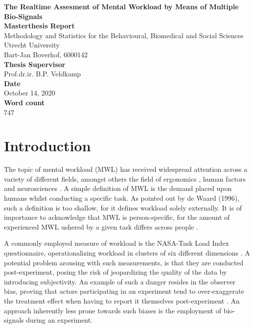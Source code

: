 \documentclass{article}
\begin{document}
\begin{titlepage}
\begin{center}
\LARGE{\textbf{The Realtime Assesment of Mental Workload by Means of Multiple Bio-Signals}}\\
\vspace*{2\baselineskip}
\Large{\textbf{Masterthesis Report}}\\
Methodology and Statistics for the Behavioural, Biomedical and Social Sciences\\
\vspace*{1\baselineskip}
Utrecht University\\
\vspace*{8\baselineskip}
{Bart-Jan Boverhof, 6000142}\\
\vspace*{1\baselineskip}
{\textbf{Thesis Supervisor}}\\
Prof.dr.ir. B.P. Veldkamp\\
\vspace*{1\baselineskip}
{\textbf{Date}}\\
October 14, 2020\\
\vspace*{1\baselineskip}
{\textbf{Word count}}\\
747\\
\vspace*{1\baselineskip}
\end{center}
\end{titlepage}

\section{Introduction}
The topic of mental workload (MWL) has received widespread attention across a variety of different fields, amongst others the field of ergonomics \cite{young2015state}, human factors \cite{pretorius2007development} and neurosciences \cite{shuggi2017mental}. A simple definition of MWL is the demand placed upon humans whilst conducting a specific task. As pointed out by de Waard (1996), such a definition is too shallow, for it defines workload solely externally. It is of importance to acknowledge that MWL is person-specific, for the amount of experienced MWL ushered by a given task differs across people \cite{de1996measurement}.

A commonly employed measure of workload is the NASA-Task Load Index questionnaire, operationalizing workload in clusters of six different dimensions \cite{hart2006nasa}. A potential problem arousing with such measurements, is that they are conducted post-experiment, posing the risk of jeopardizing the quality of the data by introducing subjectivity. An example of such a danger resides in the observer bias, proving that actors participating in an experiment tend to over-exaggerate the treatment effect when having to report it themselves post-experiment \cite{mahtani2018catalogue}. An approach inherently less prone towards such biases is the employment of bio-signals during an experiment.
\end{document}
